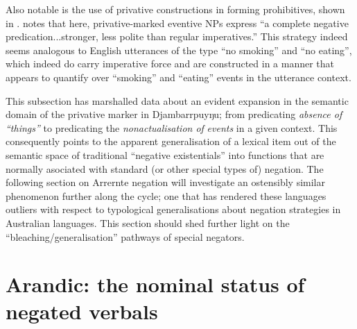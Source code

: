 \documentclass[output=paper]{langsci/langscibook}
\begin{document}
Also notable is the use of privative constructions in forming prohibitives,
shown in . \citet[446]{Wilkinson1991} notes that here, privative-marked eventive NPs express ``a complete negative predication...stronger, less polite than regular imperatives.'' This strategy indeed seems analogous to English utterances of the type ``no smoking'' and ``no eating'', which indeed do carry imperative force and are constructed in a manner that appears to quantify over ``smoking'' and ``eating'' events in the utterance context.

This subsection has marshalled data about an evident expansion in the
semantic domain of the privative marker in Djambarrpuyŋu; from
predicating\textit{ absence of ``things''} to predicating the
\textit{nonactualisation of }\textit{events} in a given context. This
consequently points to the apparent generalisation of a lexical item out of
the semantic space of traditional ``negative existentials'' into functions
that are normally asociated with standard (or other special types of)
negation. The following section on Arrernte negation will investigate an
ostensibly similar phenomenon further along the cycle; one that has
rendered these languages outliers with respect to typological
generalisations about negation strategies in Australian languages. This
section should shed further light on the ``bleaching\slash generalisation''
pathways of special negators.


\section{Arandic: the nominal status of negated verbals}\label{sec:austr-5}
\end{document}
